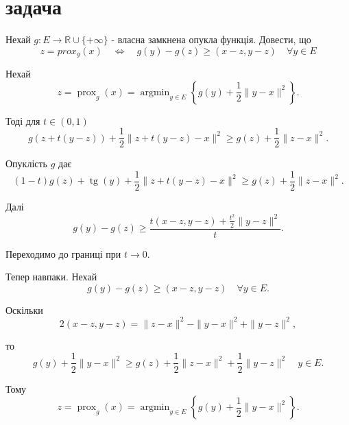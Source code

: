 \section{задача}


\begin{tcolorbox}[title=Умова]
    Нехай $ g: E \rightarrow \mathbb{R} \cup \{+\infty\} $ - власна замкнена 
    опукла функція. Довести, що 
    $$ z = prox_g(x) \quad 
    \Leftrightarrow \quad g(y) - g(z) \geq (x - z, y - z) \quad 
    \forall y \in E$$
\end{tcolorbox}

Нехай
$$
z=\operatorname{prox}_g(x)=\operatorname{argmin}_{y \in E}\left\{g(y)+\frac{1}{2}\|y-x\|^2\right\} .
$$

Тоді для $t \in(0,1)$
$$
g(z+t(y-z))+\frac{1}{2}\|z+t(y-z)-x\|^2 \geq g(z)+\frac{1}{2}\|z-x\|^2 .
$$

Опуклість $g$ дає
$$
(1-t) g(z)+\operatorname{tg}(y)+\frac{1}{2}\|z+t(y-z)-x\|^2 \geq g(z)+\frac{1}{2}\|z-x\|^2 .
$$

Далі
$$
g(y)-g(z) \geq \frac{t(x-z, y-z)+\frac{t^2}{2}\|y-z\|^2}{t} .
$$

Переходимо до границі при $t \rightarrow 0$. 

Тепер навпаки. Нехай
$$
g(y)-g(z) \geq(x-z, y-z) \quad \forall y \in E .
$$

Оскільки
$$
2(x-z, y-z)=\|z-x\|^2-\|y-x\|^2+\|y-z\|^2,
$$

то
$$
g(y)+\frac{1}{2}\|y-x\|^2 \geq g(z)+\frac{1}{2}\|z-x\|^2+\frac{1}{2}\|y-z\|^2 \quad y \in E .
$$

Тому
$$
z=\operatorname{prox}_g(x)=\operatorname{argmin}_{y \in E}\left\{g(y)+\frac{1}{2}\|y-x\|^2\right\} .
$$
